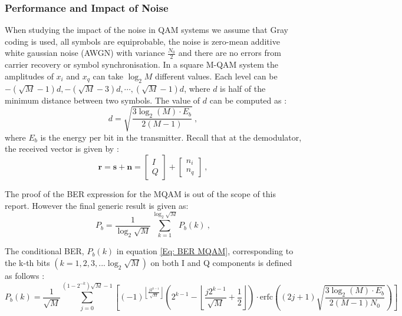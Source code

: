 \documentclass[12pt,a4paper,openright]{report}
\begin{document}
\subsubsection{Performance and Impact of Noise}
\label{sec:MQAMperf}
When studying the impact of the noise in QAM systems we assume that Gray coding is used, all symbols are equiprobable, the noise is zero-mean additive white gaussian noise (AWGN) with variance $\frac{N_0}{2}$ and there are no errors from carrier recovery or symbol synchronisation. In a square M-QAM system the amplitudes of $x_i$ and $x_q$ can take $\log_2{M}$ different values. Each level can be \
$ -(\sqrt M  -1)d, - (\sqrt M  - 3)d,\cdots,(\sqrt M  - 1)d $, where $d$ is half of the minimum distance between two symbols. The value of $d$ can be computed as \cite{BER-QAM paper}: 
\begin{equation}\label{Eq: MQAM min dist}
d = \sqrt {\frac{{3{{\log }_2}(M) \cdot {E_b}}}{{2(M - 1)}}}\ ,
\end{equation}
where $E_b$ is the energy per bit in the transmitter. Recall that at the demodulator, the received vector is given by \cite{BER-QAM paper}: 
\begin{equation}
 \mathbf{r}=\mathbf{s}+\mathbf{n}=\left[ \begin{array}{l}I\\Q \end{array} \right] + \left[ \begin{array}{l}{n_i}\\{n_q}\end{array} \right]\ ,
\end{equation}


The proof of the BER expression for the MQAM is out of the scope of this report. However the final generic result is given as: 
\begin{equation}\label{Eq: BER MQAM}
{P_b} = \frac{1}{{{{\log }_2}\sqrt M }}\sum\limits_{k = 1}^{{{\log }_2}\sqrt M } {{P_b}(k)}\ ,
\end{equation}


The conditional BER,  $P_b(k)$ in equation \ref{Eq: BER MQAM}, corresponding to the k-th bits $(k=1,2,3,... \log_2{\sqrt{M}} )$ on both I and Q components is defined as follows \cite{BER-QAM paper}:
\begin{equation} \label{eq:mqamBER}
{P_b}(k) = \frac{1}{{\sqrt M }}\sum\limits_{j = 0}^{(1 - {2^{ - k}})\sqrt M  - 1} {\left[ {{{( - 1)}^{\left\lfloor {\frac{{j{2^{k - 1}}}}{{\sqrt M }}} \right\rfloor }}\left( {{2^{k - 1}} - \left\lfloor {\frac{{j{2^{k - 1}}}}{{\sqrt M }} + \frac{1}{2}} \right\rfloor } \right) \cdot \text{erfc}\left( {(2j + 1)\sqrt {\frac{{3{{\log }_2}(M) \cdot {E_b}}}{{2(M - 1){N_0}}}} } \right)} \right]}
\end{equation}
\end{document}
